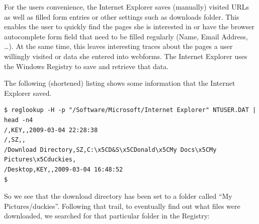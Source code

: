 \documentclass[a4paper,
    11pt,
    normalheadings,
    parindent,
    UKenglish,
    abstracton,
    ]{scrartcl}
\begin{document}
For the users convenience, the Internet Explorer saves (manually) visited URLs as well as filled form entries or other settings such as downloads folder.
This enables the user to quickly find the pages she is interested in or have the browser autocomplete form field that need to be filled regularly (Name, Email Address, \ldots{}).
At the same time, this leaves interesting traces about the pages a user willingly visited or data she entered into webforms.
The Internet Explorer uses the Windows Registry to save and retrieve that data.

The following (shortened) listing shows some information that the Internet Explorer saved.
\begin{verbatim}
$ reglookup -H -p "/Software/Microsoft/Internet Explorer" NTUSER.DAT | head -n4
/,KEY,,2009-03-04 22:28:38
/,SZ,,
/Download Directory,SZ,C:\x5CD&S\x5CDonald\x5CMy Docs\x5CMy Pictures\x5Cduckies,
/Desktop,KEY,,2009-03-04 16:48:52
$
\end{verbatim}

So we see that the download directory has been set to a folder called ``My Pictures/duckies''.
Following that trail, to eventually find out what files were downloaded, we searched for that particular folder in the Registry:
\end{document}
